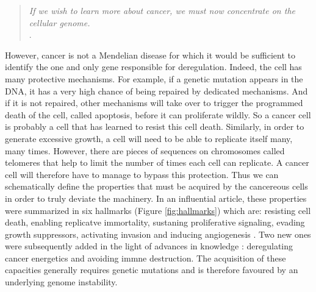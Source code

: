 \documentclass[a4paper,12pt,twoside,onecolumn,openright,final,oldfontcommands]{memoir}
\begin{document}
\begin{quote}
\emph{If we wish to learn more about cancer, we must now concentrate on
the cellular genome.}\\
\citep{dulbecco1986turning}.
\end{quote}

However, cancer is not a Mendelian disease for which it would be
sufficient to identify the one and only gene responsible for
deregulation. Indeed, the cell has many protective mechanisms. For
example, if a genetic mutation appears in the DNA, it has a very high
chance of being repaired by dedicated mechanisms. And if it is not
repaired, other mechanisms will take over to trigger the programmed
death of the cell, called apoptosis, before it can proliferate wildly.
So a cancer cell is probably a cell that has learned to resist this cell
death. Similarly, in order to generate excessive growth, a cell will
need to be able to replicate itself many, many times. However, there are
pieces of sequences on chromosomes called telomeres that help to limit
the number of times each cell can replicate. A cancer cell will
therefore have to manage to bypass this protection. Thus we can
schematically define the properties that must be acquired by the
cancereous cells in order to truly deviate the machinery. In an
influential article, these properties were summarized in six hallmarks
(Figure \ref{fig:hallmarks}) which are: resisting cell death, enabling
replicatve immortality, sustaning proliferative signaling, evading
growth suppressors, activating invasion and inducing angiogenesis
\citep{hanahan2000hallmarks}. Two new ones were subsequently added in
the light of advances in knowledge \citep{hanahan2011hallmarks}:
deregulating cancer energetics and avoiding immne destruction. The
acquisition of these capacities generally requires genetic mutations and
is therefore favoured by an underlying genome instability.
\end{document}
